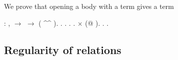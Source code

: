 \documentclass[12pt]{report}
\begin{document}
We prove that opening a body with a term gives a term 
\begin{coqdoccode}
\coqdocemptyline
\coqdocnoindent
{}  : \coqdockw{\ensuremath{\forall}}  ,\coqdoceol
\coqdocindent{1.00em}
  \ensuremath{\rightarrow}   \ensuremath{\rightarrow}  ( \^{}\^{} ).\coqdoceol
\coqdocnoindent
{}.\coqdoceol
\coqdocindent{1.00em}
.  .  . \ensuremath{\times} (@ ).\coqdoceol
\coqdocnoindent
{}.\coqdoceol
\coqdocemptyline
\coqdocnoindent
{} .\coqdoceol
\coqdocemptyline
\end{coqdoccode}
\subsection{Regularity of relations}
\end{document}
